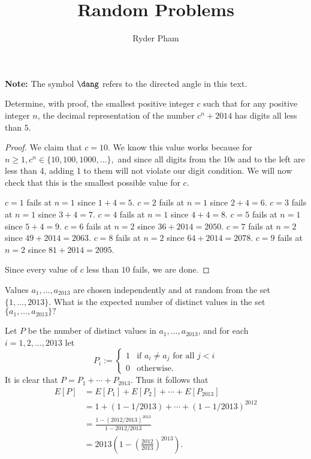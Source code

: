 \documentclass[letterpaper,oneside]{scrartcl}
\begin{document}
\title{Random Problems}
\author{Ryder Pham}
\maketitle

\textbf{Note:} The symbol $\dang$ refers to the directed angle in this text.

\begin{problem*}
  Determine, with proof, the smallest positive integer $c$ such that for any positive integer $n$, the decimal representation of the number $c^n + 2014$ has digits all less than $5$.
\end{problem*}
\begin{proof}
  We claim that $c=10.$ We know this value works because for $n\geq 1, c^n \in \{10,100,1000,\dots\},$ and since all digits from the 10s and to the left are less than 4, adding 1 to them will not violate our digit condition. We will now check that this is the smallest possible value for $c.$
  \begin{itemize}
    \ii $c=1$ fails at $n=1$ since $1+4=5.$
    \ii $c=2$ fails at $n=1$ since $2+4=6.$
    \ii $c=3$ fails at $n=1$ since $3+4=7.$
    \ii $c=4$ fails at $n=1$ since $4+4=8.$
    \ii $c=5$ fails at $n=1$ since $5+4=9.$
    \ii $c=6$ fails at $n=2$ since $36+2014=2050.$
    \ii $c=7$ fails at $n=2$ since $49+2014=2063.$
    \ii $c=8$ fails at $n=2$ since $64+2014=2078.$
    \ii $c=9$ fails at $n=2$ since $81+2014=2095.$
  \end{itemize}
  Since every value of $c$ less than $10$ fails, we are done.
\end{proof}
\begin{problem*}
  Values $a_1,\dots,a_{2013}$ are chosen independently and at random from the set $\{1,\dots,2013\}.$ What is the expected number of distinct values in the set $\{a_1,\dots,a_{2013}\}?$
\end{problem*}
\begin{soln}
  Let $P$ be the number of distinct values in ${a_1,\dots,a_{2013}}$, and for each $i=1,2,\dots,2013$ let
  $$
    P_i :=
    \begin{cases}
      1 & \text{if } a_i \neq a_j \text{ for all } j < i \\
      0 & \text{otherwise.}
    \end{cases}
  $$
  It is clear that $P = P_1+\cdots+P_{2013}.$ Thus it follows that
  \begin{align*}
    E[P] & =E[P_1]+E[P_2]+\cdots+E[P_{2013}]                           \\
         & = 1+(1-1/2013)+\cdots+(1-1/2013)^{2012}                     \\
         & = \frac{1-(2012/2013)^{2013}}{1-2012/2013}                  \\
         & = 2013\left(1-\left(\frac{2012}{2013}\right)^{2013}\right).
  \end{align*}
\end{soln}
\end{document}
